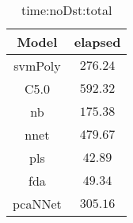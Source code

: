 \begin{table}[!ht]
	\centering
	\begin{tabular}{|c|c|}
		\hline
		Model & elapsed \\ \hline
		svmPoly & $276.24$ \\ \hline
		C5.0 & $592.32$ \\ \hline
		nb & $175.38$ \\ \hline
		nnet & $479.67$ \\ \hline
		pls & $42.89$ \\ \hline
		fda & $49.34$ \\ \hline
		pcaNNet & $305.16$ \\ \hline
	\end{tabular}
	\caption{time:noDst:total}
	\label{tab:time:noDst:total}
\end{table}
